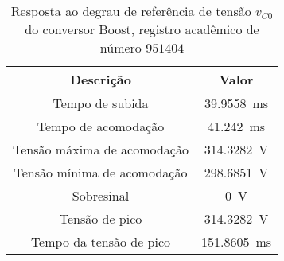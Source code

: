 \begin{table}[!ht]
\centering
\caption{Resposta ao degrau de referência de tensão $v_{C0}$ do conversor Boost, registro acadêmico de número $951404$}
\label{tab:parametros}
\begin{tabular}{@{}cc@{}}
\toprule
\textbf{Descrição} & \textbf{Valor}\\ \midrule
Tempo de subida & \SI{39.9558}{\milli\s}\\
Tempo de acomodação & \SI{41.242}{\milli\s}\\
Tensão máxima de acomodação & \SI{314.3282}{\V}\\
Tensão mínima de acomodação & \SI{298.6851}{\V}\\
Sobresinal & \SI{0}{\V}\\
Tensão de pico & \SI{314.3282}{\V}\\
Tempo da tensão de pico & \SI{151.8605}{\milli\s}\\
\bottomrule
\end{tabular}
\end{table}

